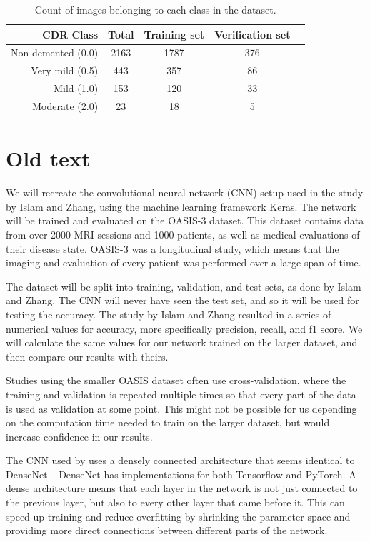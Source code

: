 \documentclass{kththesis}
\begin{document}
\begin{table}[h]
  
  \begin{center}
    \caption{Count of images belonging to each class in the dataset.\label{tab:dataset_contents}}
    \begin{tabular}{r|cccc}
      \textbf{CDR Class} & \textbf{Total} & \textbf{Training set} & \textbf{Verification set} \\
      \toprule
      Non-demented (0.0) & 2163 & 1787 & 376 \\
      Very mild (0.5) & 443 & 357 & 86 \\
      Mild (1.0) & 153 & 120 & 33 \\
      Moderate (2.0) & 23 & 18 & 5 \\
    \end{tabular}
  \end{center}
\end{table}

\section{Old text}
We will recreate the convolutional neural network (CNN) setup used in the study by Islam and Zhang, using the machine learning framework Keras. The network will be trained and evaluated on the OASIS-3 dataset. This dataset contains data from over 2000 MRI sessions and 1000 patients, as well as medical evaluations of their disease state. OASIS-3 was a longitudinal study, which means that the imaging and evaluation of every patient was performed over a large span of time.

The dataset will be split into training, validation, and test sets, as done by Islam and Zhang. The CNN will never have seen the test set, and so it will be used for testing the accuracy. The study by Islam and Zhang resulted in a series of numerical values for accuracy, more specifically precision, recall, and f1 score. We will calculate the same values for our network trained on the larger dataset, and then compare our results with theirs. 

Studies using the smaller OASIS dataset often use cross-validation, where the training and validation is repeated multiple times so that every part of the data is used as validation at some point. This might not be possible for us depending on the computation time needed to train on the larger dataset, but would increase confidence in our results.

The CNN used by \textcite{islam2018early} uses a densely connected architecture that seems identical to DenseNet~\cite{huang2017densely}. DenseNet has implementations for both Tensorflow and PyTorch. A dense architecture means that each layer in the network is not just connected to the previous layer, but also to every other layer that came before it. This can speed up training and reduce overfitting by shrinking the parameter space and providing more direct connections between different parts of the network.
\end{document}
